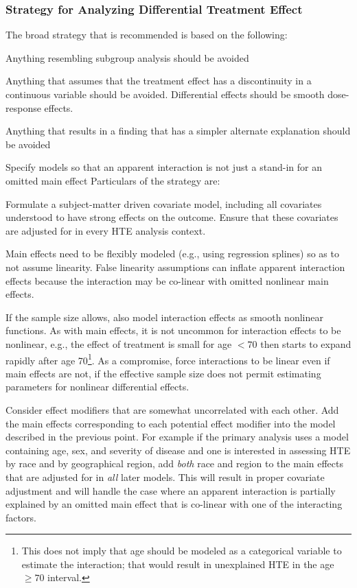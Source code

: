 \subsubsection{Strategy for Analyzing Differential Treatment Effect}
The broad strategy that is recommended is based on the following:
\bi
\item Anything resembling subgroup analysis should be avoided
\item Anything that assumes that the treatment effect has a discontinuity in a continuous variable should be avoided.  Differential effects should be smooth dose-response effects.
\item Anything that results in a finding that has a simpler alternate explanation should be avoided
  \bi
  \item Specify models so that an apparent interaction is not just a stand-in for an omitted main effect
  \ei
\ei
Particulars of the strategy are:
\bi
\item Formulate a subject-matter driven covariate model, including all covariates understood to have strong effects on the outcome.  Ensure that these covariates are adjusted for in every HTE analysis context.
\item Main effects need to be flexibly modeled (e.g., using regression splines) so as to not assume linearity.  False linearity assumptions can inflate apparent interaction effects because the interaction may be co-linear with omitted nonlinear main effects.
\item If the sample size allows, also model interaction effects as smooth nonlinear functions.  As with main effects, it is not uncommon for interaction effects to be nonlinear, e.g., the effect of treatment is small for age $<70$ then starts to expand rapidly after age 70\footnote{This does not imply that age should be modeled as a categorical variable to estimate the interaction; that would result in unexplained HTE in the age $\geq 70$ interval.}.  As a compromise, force interactions to be linear even if main effects are not, if the effective sample size does not permit estimating parameters for nonlinear differential effects.
\item Consider effect modifiers that are somewhat uncorrelated with each other.  Add the main effects corresponding to each potential effect modifier into the model described in the previous point.  For example if the primary analysis uses a model containing age, sex, and severity of disease and one is interested in assessing HTE by race and by geographical region, add \emph{both} race and region to the main effects that are adjusted for in \emph{all} later models.  This will result in proper covariate adjustment and will handle the case where an apparent interaction is partially explained by an omitted main effect that is co-linear with one of the interacting factors.
